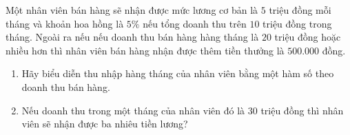\begin{bt}%
	Một nhân viên bán hàng sẽ nhận được mức lương cơ bản  là $5$ triệu đồng mỗi tháng và khoản hoa hồng là $5\%$ nếu tổng doanh thu trên $10$ triệu đồng trong tháng. Ngoài ra nếu nếu doanh thu bán hàng hàng tháng là $20$ triệu đồng hoặc nhiều hơn thì nhân viên bán hàng nhận được thêm tiền thưởng là $500.000$ đồng.
	\begin{enumerate}
		\item Hãy biểu diễn thu nhập hàng tháng của nhân viên bằng một hàm số theo doanh thu bán hàng.
		\item Nếu doanh thu trong một tháng của nhân viên đó là $30$ triệu đồng thì nhân viên sẽ nhận được ba nhiêu tiền lương?
	\end{enumerate}
\end{bt}

